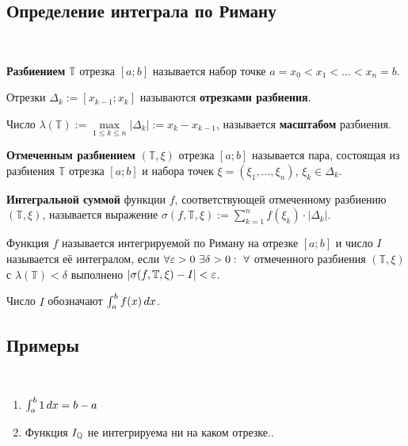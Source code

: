 \documentclass[a4paper]{article}
\theoremstyle{named}
\newcommand{\T}{\mathbb{T}}
\renewcommand{\int}{\intop}
\begin{document}
        \subsection{Определение интеграла по Риману}

        \begin{definition*}~

            \textbf{Разбиением} $\T$ отрезка $[a; b]$ называется набор точке $a = x_0 < x_1 < \dots < x_n = b$.

            Отрезки $\Delta_k := [x_{k - 1}; x_k]$ называются \textbf{отрезками разбиения}.

            Число $\lambda(\T) := \max\limits_{1 \leq k \leq n} |\Delta_k| := x_k - x_{k - 1}$, называется \textbf{масштабом} разбиения.

            \textbf{Отмеченным разбиением} $(\T, \xi)$ отрезка $[a; b]$ называется пара, состоящая из разбиения $\T$ отрезка $[a; b]$ и набора точек $\xi = (\xi_1, \dots, \xi_n)$, $\xi_k \in \Delta_k$.

            \textbf{Интегральной суммой} функции $f$, соответствующей отмеченному разбиению $(\T, \xi)$, называется выражение $\sigma(f, \T, \xi) := \sum_{k = 1}^n f(\xi_k) \cdot |\Delta_k|$.
        \end{definition*}

        \begin{definition*}
            Функция $f$ называется интегрируемой по Риману на отрезке $[a; b]$ и число $I$ называется её интегралом, если $\forall \varepsilon > 0 \ \exists \delta > 0: \ \forall$ отмеченного разбиения $(\T, \xi)$ с $\lambda(\T) < \delta$ выполнено $|\sigma(f, \T, \xi) - I| < \eps$.

            Число $I$ обозначают $\int_a^b f(x) \dd x$.
        \end{definition*}

        \subsection{Примеры}

        \begin{example*}~

            \begin{enumerate}
            \item
                $\int_a^b 1 \dd x = b - a$

            \item
                Функция $I_{\mathbb{Q}}$ не интегрируема ни на каком отрезке.. 
            \end{enumerate}
        \end{example*}
\end{document}
